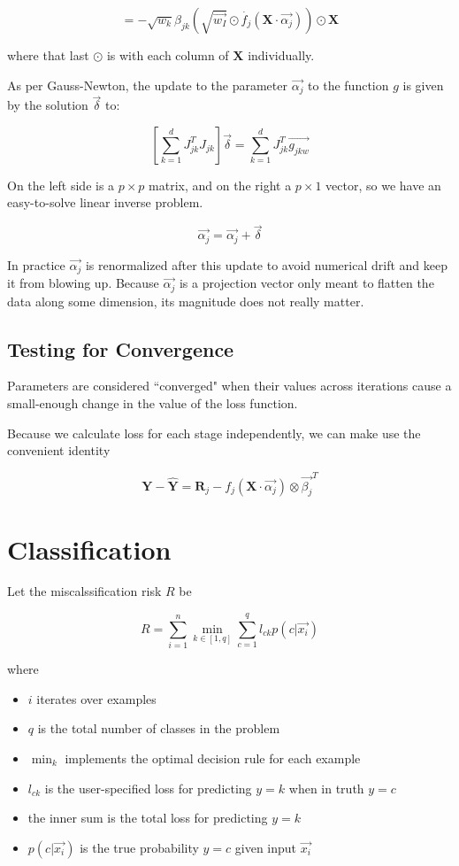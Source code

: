 \documentclass[12pt]{article}
\begin{document}
$$= -\sqrt{w_k} \beta_{jk} (\sqrt{\vec{w_I}} \odot \dot{f_j}(\pmb{X} \cdot \vec{\alpha_j})) \odot \pmb{X}$$

where that last $\odot$ is with each column of $\pmb{X}$ individually.\newline

As per Gauss-Newton, the update to the parameter $\vec{\alpha_j}$ to the function $g$ is given by the solution $\vec{\delta}$ to:

$$\left[ \sum_{k=1}^d J_{jk}^T J_{jk} \right] \vec{\delta} = \sum_{k=1}^d J_{jk}^T \vec{g_{jkw}}$$

On the left side is a $p \times p$ matrix, and on the right a $p \times 1$ vector, so we have an easy-to-solve linear inverse problem.

$$ \vec{\alpha_j} = \vec{\alpha_j} + \vec{\delta} $$

In practice $\vec{\alpha_j}$ is renormalized after this update to avoid numerical drift and keep it from blowing up. Because $\vec{\alpha_j}$ is a projection vector only meant to flatten the data along some dimension, its magnitude does not really matter.

\subsection{Testing for Convergence}

Parameters are considered ``converged" when their values across iterations cause a small-enough change in the value of the loss function.

Because we calculate loss for each stage independently, we can make use the convenient identity

$$\pmb{Y} - \pmb{\hat{Y}} = \pmb{R}_j - f_j(\pmb{X} \cdot \vec{\alpha_j}) \otimes \vec{\beta_j}^T$$

\section{Classification}

Let the miscalssification risk $R$ be

$$R = \sum_{i=1}^n \min_{k \in [1,q]} \sum_{c=1}^q l_{ck} p(c | \vec{x_i})$$

where
\begin{itemize}
	\setlength\itemsep{-2mm}
	\item $i$ iterates over examples
	\item $q$ is the total number of classes in the problem
	\item $\min_k$ implements the optimal decision rule for each example
	\item $l_{ck}$ is the user-specified loss for predicting $y=k$ when in truth $y=c$
	\item the inner sum is the total loss for predicting $y=k$
	\item $p(c | \vec{x_i})$ is the true probability $y=c$ given input $\vec{x_i}$
\end{itemize}
\end{document}
